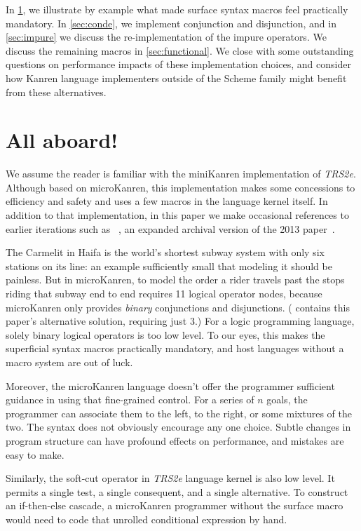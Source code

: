 \documentclass[sigplan,draft,balance,pbalance,natbib=false]{acmart}
\begin{document}
In \cref{sec:all-aboard}, we illustrate by example what made surface
syntax macros feel practically mandatory. In \cref{sec:conde}, we
implement conjunction and disjunction, and in \cref{sec:impure} we
discuss the re-implementation of the impure operators. We discuss the
remaining macros in \cref{sec:functional}. We close with some
outstanding questions on performance impacts of these implementation
choices, and consider how Kanren language implementers outside of the
Scheme family might benefit from these alternatives.

\section{All aboard!}\label{sec:all-aboard}

We assume the reader is familiar with the miniKanren implementation of
\emph{TRS2e}. Although based on microKanren, this implementation makes
some concessions to efficiency and safety and uses a few macros in the
language kernel itself. In addition to that implementation, in this
paper we make occasional references to earlier iterations such as
\citeauthor{hemann2016small}~\cite{hemann2016small}, an expanded
archival version of the 2013 paper~\cite{hemann2013muKanren}.

The Carmelit in Haifa is the world's shortest subway system with only
six stations on its line: an example sufficiently small that modeling
it should be painless. But in microKanren, to model the order a rider
travels past the stops riding that subway end to end requires 11
logical operator nodes, because microKanren only provides
\emph{binary} conjunctions and disjunctions. (
contains this paper's alternative solution, requiring just 3.) For a
logic programming language, solely binary logical operators is too low
level. To our eyes, this makes the superficial syntax macros
practically mandatory, and host languages without a macro system are
out of luck.

Moreover, the microKanren language doesn't offer the programmer
sufficient guidance in using that fine-grained control. For a series
of $n$ goals, the programmer can associate them to the left, to the
right, or some mixtures of the two. The syntax does not obviously
encourage any one choice. Subtle changes in program structure can have
profound effects on performance, and mistakes are easy to make.

Similarly, the soft-cut operator  in \emph{TRS2e}
language kernel is also low level. It permits a single test, a single
consequent, and a single alternative. To construct an if-then-else
cascade, a microKanren programmer without the 
surface macro would need to code that unrolled conditional expression
by hand.
\end{document}
